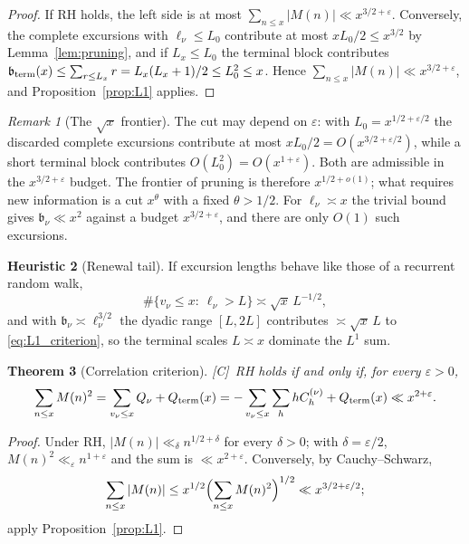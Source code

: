 \documentclass[11pt]{amsart}
\numberwithin{equation}{section}
\theoremstyle{plain}
\newtheorem{theorem}{Theorem}[section]
\theoremstyle{definition}
\newtheorem{heuristic}[theorem]{Heuristic}
\theoremstyle{remark}
\newtheorem{remark}[theorem]{Remark}
\newcommand{\eps}{\varepsilon}
\newcommand{\tagC}{\textup{[C]}}
\begin{document}
\begin{proof}
If RH holds, the left side is at most $\sum_{n\le x}|M(n)|\ll x^{3/2+\eps}$.
Conversely, the complete excursions with $\ell_\nu\le L_0$ contribute at
most $xL_0/2\le x^{3/2}$ by Lemma~\ref{lem:pruning}, and if $L_x\le L_0$
the terminal block contributes
$\mathfrak b_{\rm term}(x)\le\sum_{r\le L_x}r=L_x(L_x+1)/2\le L_0^2\le x$.
Hence $\sum_{n\le x}|M(n)|\ll x^{3/2+\eps}$, and
Proposition~\ref{prop:L1} applies.
\end{proof}

\begin{remark}[The $\sqrt{x}$ frontier]
\label{rem:sqrt_frontier}
The cut may depend on $\eps$: with $L_0=x^{1/2+\eps/2}$ the discarded
complete excursions contribute at most $xL_0/2=O(x^{3/2+\eps/2})$, while a
short terminal block contributes
$O(L_0^2)=O(x^{1+\eps})$.  Both are admissible in the
$x^{3/2+\eps}$ budget.  The frontier of pruning is therefore
$x^{1/2+o(1)}$;
what requires new information is a cut $x^{\theta}$ with a fixed
$\theta>1/2$. For $\ell_\nu\asymp x$ the trivial bound gives
$\mathfrak b_\nu\ll x^2$ against a budget $x^{3/2+\eps}$, and there are only
$O(1)$ such excursions.
\end{remark}

\begin{heuristic}[Renewal tail]
\label{heu:renewal}
If excursion lengths behave like those of a recurrent random walk,
\begin{equation}
\label{eq:renewal_tail}
  \#\{v_\nu\le x:\ \ell_\nu>L\}\asymp\sqrt{x}\,L^{-1/2},
\end{equation}
and with $\mathfrak b_\nu\asymp\ell_\nu^{3/2}$ the dyadic range $[L,2L]$
contributes $\asymp\sqrt{x}\,L$ to \eqref{eq:L1_criterion}, so the terminal
scales $L\asymp x$ dominate the $L^1$ sum.
\end{heuristic}

\begin{theorem}[Correlation criterion]
\label{thm:corr-criterion}
\tagC\ RH holds if and only if, for every $\eps>0$,
\begin{equation}
\label{eq:RH-corr}
  \sum_{n\le x}M(n)^2=\sum_{v_\nu\le x}Q_\nu+Q_{\rm term}(x)
  =-\sum_{v_\nu\le x}\sum_{h}hC^{(\nu)}_h+Q_{\rm term}(x)\ll x^{2+\eps}.
\end{equation}
\end{theorem}

\begin{proof}
Under RH, $|M(n)|\ll_\delta n^{1/2+\delta}$ for every $\delta>0$; with
$\delta=\eps/2$, $M(n)^2\ll_\eps n^{1+\eps}$ and the sum is $\ll x^{2+\eps}$.
Conversely, by Cauchy--Schwarz,
\[
\sum_{n\le x}|M(n)|\le x^{1/2}\Bigl(\sum_{n\le x}M(n)^2\Bigr)^{1/2}\ll x^{3/2+\eps/2};
\]
apply
Proposition~\ref{prop:L1}.
\end{proof}
\end{document}
